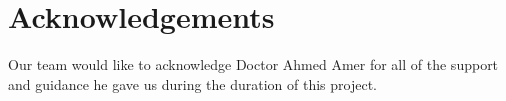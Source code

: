 \chapter{Acknowledgements}
Our team would like to acknowledge Doctor Ahmed Amer for all of the support and guidance he gave us during the duration of this project.
